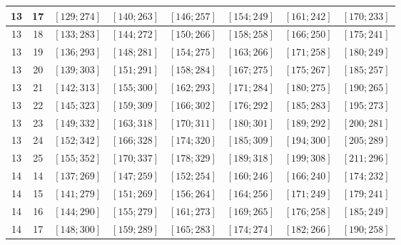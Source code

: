 \documentclass[a4paper,12pt]{article}
\begin{document}
\begin{center}
{\begin{longtable}[H]{|c|c|c|c|c|c|c|c|}
13 &  17 &  $\left[ 129; 274\right]$ &  $\left[ 140; 263\right]$ &  $\left[ 146; 257\right]$ &  $\left[ 154; 249\right]$ &  $\left[ 161; 242\right]$ &  $\left[ 170; 233\right]$ \tabularnewline \hline
13 &  18 &  $\left[ 133; 283\right]$ &  $\left[ 144; 272\right]$ &  $\left[ 150; 266\right]$ &  $\left[ 158; 258\right]$ &  $\left[ 166; 250\right]$ &  $\left[ 175; 241\right]$ \tabularnewline \hline
13 &  19 &  $\left[ 136; 293\right]$ &  $\left[ 148; 281\right]$ &  $\left[ 154; 275\right]$ &  $\left[ 163; 266\right]$ &  $\left[ 171; 258\right]$ &  $\left[ 180; 249\right]$ \tabularnewline \hline
13 &  20 &  $\left[ 139; 303\right]$ &  $\left[ 151; 291\right]$ &  $\left[ 158; 284\right]$ &  $\left[ 167; 275\right]$ &  $\left[ 175; 267\right]$ &  $\left[ 185; 257\right]$ \tabularnewline \hline
13 &  21 &  $\left[ 142; 313\right]$ &  $\left[ 155; 300\right]$ &  $\left[ 162; 293\right]$ &  $\left[ 171; 284\right]$ &  $\left[ 180; 275\right]$ &  $\left[ 190; 265\right]$ \tabularnewline \hline
13 &  22 &  $\left[ 145; 323\right]$ &  $\left[ 159; 309\right]$ &  $\left[ 166; 302\right]$ &  $\left[ 176; 292\right]$ &  $\left[ 185; 283\right]$ &  $\left[ 195; 273\right]$ \tabularnewline \hline
13 &  23 &  $\left[ 149; 332\right]$ &  $\left[ 163; 318\right]$ &  $\left[ 170; 311\right]$ &  $\left[ 180; 301\right]$ &  $\left[ 189; 292\right]$ &  $\left[ 200; 281\right]$ \tabularnewline \hline
13 &  24 &  $\left[ 152; 342\right]$ &  $\left[ 166; 328\right]$ &  $\left[ 174; 320\right]$ &  $\left[ 185; 309\right]$ &  $\left[ 194; 300\right]$ &  $\left[ 205; 289\right]$ \tabularnewline \hline
13 &  25 &  $\left[ 155; 352\right]$ &  $\left[ 170; 337\right]$ &  $\left[ 178; 329\right]$ &  $\left[ 189; 318\right]$ &  $\left[ 199; 308\right]$ &  $\left[ 211; 296\right]$ \tabularnewline \hline
14 &  14 &  $\left[ 137; 269\right]$ &  $\left[ 147; 259\right]$ &  $\left[ 152; 254\right]$ &  $\left[ 160; 246\right]$ &  $\left[ 166; 240\right]$ &  $\left[ 174; 232\right]$ \tabularnewline \hline
14 &  15 &  $\left[ 141; 279\right]$ &  $\left[ 151; 269\right]$ &  $\left[ 156; 264\right]$ &  $\left[ 164; 256\right]$ &  $\left[ 171; 249\right]$ &  $\left[ 179; 241\right]$ \tabularnewline \hline
14 &  16 &  $\left[ 144; 290\right]$ &  $\left[ 155; 279\right]$ &  $\left[ 161; 273\right]$ &  $\left[ 169; 265\right]$ &  $\left[ 176; 258\right]$ &  $\left[ 185; 249\right]$ \tabularnewline \hline
14 &  17 &  $\left[ 148; 300\right]$ &  $\left[ 159; 289\right]$ &  $\left[ 165; 283\right]$ &  $\left[ 174; 274\right]$ &  $\left[ 182; 266\right]$ &  $\left[ 190; 258\right]$ \tabularnewline \hline

\end{longtable}}
\end{center}
\end{document}
